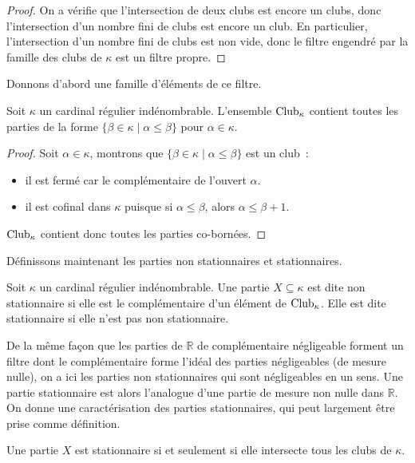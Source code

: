 \begin{proof}
  On a vérifie que l'intersection de deux clubs est encore un clubs, donc
  l'intersection d'un nombre fini de clubs est encore un club. En particulier,
  l'intersection d'un nombre fini de clubs est non vide, donc le filtre engendré
  par la famille des clubs de $\kappa$ est un filtre propre.
\end{proof}

Donnons d'abord une famille d'éléments de ce filtre.

\begin{property}
  Soit $\kappa$ un cardinal régulier indénombrable. L'ensemble $\operatorname{Club}_\kappa$
  contient toutes les parties de la forme
  $\{\beta \in\kappa\mid \alpha\leq\beta\}$ pour $\alpha \in \kappa$.
\end{property}

\begin{proof}
  Soit $\alpha \in \kappa$, montrons que $\{\beta\in\kappa\mid\alpha\leq\beta\}$
  est un club~:
  \begin{itemize}
  \item il est fermé car le complémentaire de l'ouvert $\alpha$.
  \item il est cofinal dans $\kappa$ puisque si $\alpha \leq \beta$, alors
    $\alpha \leq \beta + 1$.
  \end{itemize}
  $\operatorname{Club}_\kappa$ contient donc toutes les parties co-bornées.
\end{proof}

Définissons maintenant les parties non stationnaires et stationnaires.

\begin{definition}
  Soit $\kappa$ un cardinal régulier indénombrable. Une partie
  $X\subseteq\kappa$ est dite non stationnaire si elle est le complémentaire
  d'un élément de $\operatorname{Club}_\kappa$. Elle est dite stationnaire si elle n'est pas
  non stationnaire.
\end{definition}

De la même façon que les parties de $\mathbb R$ de complémentaire négligeable
forment un filtre dont le complémentaire forme l'idéal des parties négligeables
(de mesure nulle), on a ici les parties non stationnaires qui sont négligeables
en un sens. Une partie stationnaire est alors l'analogue d'une partie de mesure
non nulle dans $\mathbb R$. On donne une caractérisation des parties
stationnaires, qui peut largement être prise comme définition.

\begin{proposition}
  Une partie $X$ est stationnaire si et seulement si elle intersecte tous les
  clubs de $\kappa$.
\end{proposition}

